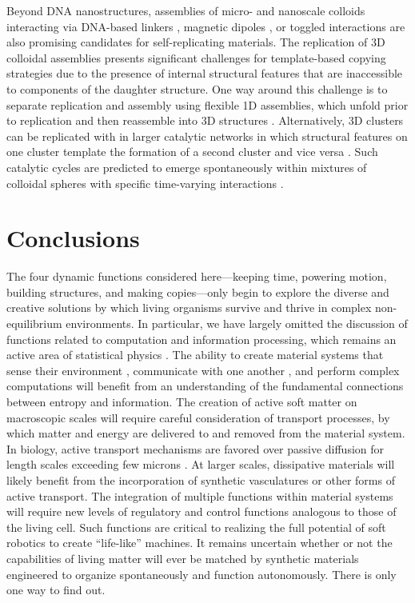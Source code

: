 \begin{appendices}
Beyond DNA nanostructures, assemblies of micro- and nanoscale colloids interacting via DNA-based linkers \cite{leunissen2009towards}, magnetic dipoles \cite{zhang2014self, dempster2015self}, or toggled interactions \cite{zhang2014accelerated,sherman2016dynamic} are also promising candidates for self-replicating materials. The replication of 3D colloidal assemblies presents significant challenges for template-based copying strategies due to the presence of internal structural features that are inaccessible to components of the daughter structure.  One way around this challenge is to separate replication and assembly using flexible 1D assemblies, which unfold prior to replication and then reassemble into 3D structures \cite{cademartiri2014programmable}.  Alternatively, 3D clusters can be replicated with in larger catalytic networks in which structural features on one cluster template the formation of a second cluster and vice versa \cite{Zeravcic2014}.  Such catalytic cycles are predicted to emerge spontaneously within mixtures of colloidal spheres with specific time-varying interactions \cite{Zeravcic2017}.

\section{Conclusions}

The four dynamic functions considered here---keeping time, powering motion, building structures, and making copies---only begin to explore the diverse and creative solutions by which living organisms survive and thrive in complex non-equilibrium environments. In particular, we have largely omitted the discussion of functions related to computation and information processing, which remains an active area of statistical physics \cite{Parrondo2015, Lutz2015}. The ability to create material systems that sense their environment \cite{della2018fuel}, communicate with one another \cite{chen2013programmable}, and perform complex computations \cite{fang2016pattern} will benefit from an understanding of the fundamental connections between entropy and information. The creation of active soft matter on macroscopic scales will require careful consideration of transport processes, by which matter and energy are delivered to and removed from the material system. In biology, active transport mechanisms are favored over passive diffusion for length scales exceeding few microns \cite{soh2010reaction}. At larger scales, dissipative materials will likely benefit from the incorporation of synthetic vasculatures or other forms of active transport. The integration of multiple functions within material systems will require new levels of regulatory and control functions \cite{he2012synthetic} analogous to those of the living cell. Such functions are critical to realizing the full potential of soft robotics \cite{whitesides2018soft} to create ``life-like'' machines. It remains uncertain whether or not the capabilities of living matter will ever be matched by synthetic materials engineered to organize spontaneously and function autonomously. There is only one way to find out.
\end{appendices}